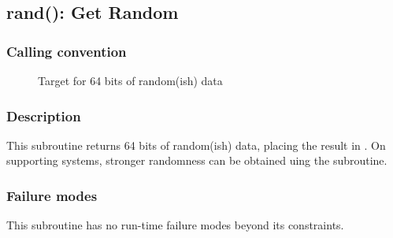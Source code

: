 \clearpage
{}
{}
\label{subr:rand}
\subsection*{rand(): Get Random}

\subsubsection*{Calling convention}

\begin{description}
\item[] Target for 64 bits of random(ish) data
\end{description}

\subsubsection*{Description}

This subroutine returns 64 bits of random(ish) data, placing the result in
.
On supporting systems, stronger randomness can be obtained uing the
\hyperref[subr:random]{} subroutine.

\subsubsection*{Failure modes}

This subroutine has no run-time failure modes beyond its constraints.

